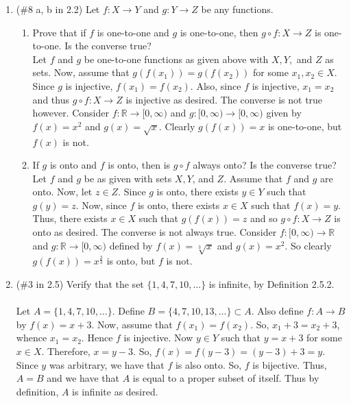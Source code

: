 \documentclass[12pt]{article}
\begin{document}
\begin{enumerate}
\item (\#8 a, b in 2.2) Let $f:X\to Y$ and $g:Y\to Z$ be any functions.
  \begin{enumerate}
  \item Prove that if $f$ is one-to-one and $g$ is one-to-one, then $g\circ f:X\to Z$ is one-to-one. Is the converse true?\\
Let $f$ and $g$ be one-to-one functions as given above with $X, Y,$ and $Z$ as sets. Now, assume that $g(f(x_1))=g(f(x_2))$ for some $x_1, x_2\in X$. Since $g$ is injective, $f(x_1)=f(x_2)$. Also, since $f$ is injective, $x_1=x_2$ and thus $g\circ f:X\rightarrow Z$ is injective as desired. The converse is not true however. Consider $f:\mathbb{R}\rightarrow[0,\infty)$ and $g:[0,\infty)\rightarrow[0,\infty)$ given by $f(x)=x^2$ and $g(x)=\sqrt{x}$. Clearly $g(f(x))=x$ is one-to-one, but $f(x)$ is not.\\[10pt]
  \item If $g$ is onto and $f$ is onto, then is $g\circ f$ always onto? Is the converse true?\\
Let $f$ and $g$ be as given with sets $X, Y$, and $Z$. Assume that $f$ and $g$ are onto. Now, let $z\in Z$. Since $g$ is onto, there exists $y\in Y$ such that $g(y)=z$. Now, since $f$ is onto, there exists $x\in X$ such that $f(x)=y$. Thus, there exists $x\in X$ such that $g(f(x))=z$ and so $g\circ f:X\rightarrow Z$ is onto as desired. The converse is not always true. Consider $f:[0,\infty)\rightarrow\mathbb{R}$ and $g:\mathbb{R}\rightarrow[0,\infty)$ defined by $f(x)=\sqrt[3]{x}$ and $g(x)=x^2$. So clearly $g(f(x))=x^{\frac23}$ is onto, but $f$ is not.\\[20pt]
  \end{enumerate}


\item (\#3 in 2.5) Verify that the set $\{1,4,7,10,\ldots\}$ is infinite, by Definition 2.5.2.\\\\
Let $A=\{1,4,7,10,\ldots\}$. Define $B=\{4,7,10,13,\ldots\}\subset A$. Also define $f:A\rightarrow B$ by $f(x)=x+3$. Now, assume that $f(x_1)=f(x_2)$. So, $x_1+3=x_2+3$, whence $x_1=x_2$. Hence $f$ is injective. Now $y\in Y$ such that $y=x+3$ for some $x\in X$. Therefore, $x=y-3$. So, $f(x)=f(y-3)=(y-3)+3=y$. Since $y$ was arbitrary, we have that $f$ is also onto. So, $f$ is bijective. Thus, $A=B$ and we have that $A$ is equal to a proper subset of itself. Thus by definition, $A$ is infinite as desired.\\[20pt]



\end{enumerate}
\end{document}
